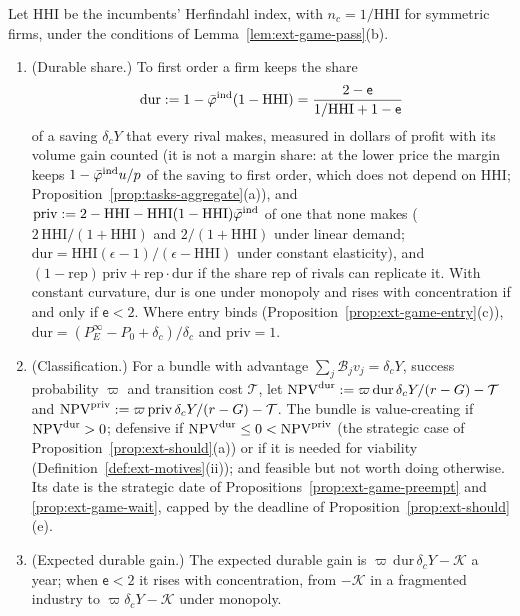 \begin{corollary}\label{cor:ext-game-engine}
Let HHI be the incumbents' Herfindahl index, with $n_c=1/\mathrm{HHI}$ for symmetric firms, under the conditions of Lemma~\ref{lem:ext-game-pass}(b).
\begin{enumerate}
\item[(a)] (Durable share.) To first order a firm keeps the share
\begin{equation}\label{eq:ext-game-dur}
\mathrm{dur}:=1-\bar\varphi^{\rm ind}(1-\mathrm{HHI})=\frac{2-\mathsf e}{1/\mathrm{HHI}+1-\mathsf e}
\end{equation}
of a saving $\delta_cY$ that every rival makes, measured in dollars of profit with its volume gain counted (it is not a margin share: at the lower price the margin keeps $1-\bar\varphi^{\rm ind}u/p$ of the saving to first order, which does not depend on HHI; Proposition~\ref{prop:tasks-aggregate}(a)), and $\mathrm{priv}:=2-\mathrm{HHI}-\mathrm{HHI}(1-\mathrm{HHI})\bar\varphi^{\rm ind}$ of one that none makes ($2\,\mathrm{HHI}/(1+\mathrm{HHI})$ and $2/(1+\mathrm{HHI})$ under linear demand; $\mathrm{dur}=\mathrm{HHI}(\epsilon-1)/(\epsilon-\mathrm{HHI})$ under constant elasticity), and $(1-\mathrm{rep})\,\mathrm{priv}+\mathrm{rep}\cdot\mathrm{dur}$ if the share rep of rivals can replicate it. With constant curvature, dur is one under monopoly and rises with concentration if and only if $\mathsf e<2$. Where entry binds (Proposition~\ref{prop:ext-game-entry}(c)), $\mathrm{dur}=(P_E^\infty-P_0+\delta_c)/\delta_c$ and $\mathrm{priv}=1$.
\item[(b)] (Classification.) For a bundle with advantage $\sum_j\mathcal B_jv_j=\delta_cY$, success probability $\varpi$ and transition cost $\mathcal T$, let $\mathrm{NPV}^{\rm dur}:=\varpi\,\mathrm{dur}\,\delta_cY/(r-G)-\mathcal T$ and $\mathrm{NPV}^{\rm priv}:=\varpi\,\mathrm{priv}\,\delta_cY/(r-G)-\mathcal T$. The bundle is value-creating if $\mathrm{NPV}^{\rm dur}>0$; defensive if $\mathrm{NPV}^{\rm dur}\le0<\mathrm{NPV}^{\rm priv}$ (the strategic case of Proposition~\ref{prop:ext-should}(a)) or if it is needed for viability (Definition~\ref{def:ext-motives}(ii)); and feasible but not worth doing otherwise. Its date is the strategic date of Propositions~\ref{prop:ext-game-preempt} and \ref{prop:ext-game-wait}, capped by the deadline of Proposition~\ref{prop:ext-should}(e).
\item[(c)] (Expected durable gain.) The expected durable gain is $\varpi\,\mathrm{dur}\,\delta_cY-\mathcal K$ a year; when $\mathsf e<2$ it rises with concentration, from $-\mathcal K$ in a fragmented industry to $\varpi\delta_cY-\mathcal K$ under monopoly.
\end{enumerate}
\end{corollary}

